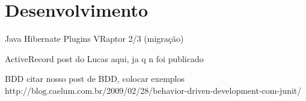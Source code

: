 \section{Desenvolvimento}
Java
Hibernate
Plugins
VRaptor 2/3 (migração)

ActiveRecord
post do Lucas aqui, ja q n foi publicado

BDD
citar nosso post de BDD, colocar exemplos
http://blog.caelum.com.br/2009/02/28/behavior-driven-development-com-junit/


